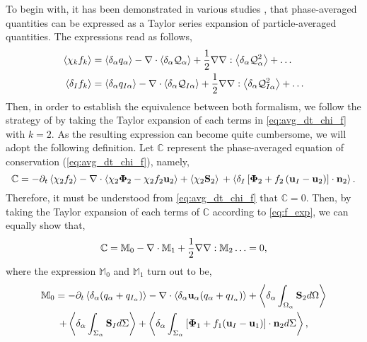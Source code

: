 To begin with, it has been demonstrated in various studies \citep{nott2011suspension,jackson1997locally,zhang1994averaged}, that phase-averaged quantities can be expressed as a Taylor series expansion of particle-averaged quantities. 
The expressions read as follows, 
\begin{align}
    \left<\chi_kf_k\right> 
    &=  \left<\delta_\alpha q_\alpha\right>
        - \mathbf{\nabla} \cdot  
        \left<\delta_\alpha \mathcal{Q}_\alpha\right>        
        + \frac{1}{2} \mathbf{\nabla}\mathbf{\nabla} : \left<\delta_\alpha \mathcal{Q}_\alpha^2\right>
        + \ldots  \\
    \left<\delta_I f_k\right> 
    &=  \left<\delta_\alpha q_{I\alpha}\right>        
        - \mathbf{\nabla} \cdot \left<\delta_\alpha \mathcal{Q}_{I\alpha}\right>
        + \frac{1}{2} \mathbf{\nabla}\mathbf{\nabla} : \left<\delta_\alpha \mathcal{Q}_{I\alpha}^{2}\right>
        + \ldots  
    \label{eq:f_exp}
\end{align}
Then, in order to establish the equivalence between both formalism, we follow the strategy of \citep{lhuillier2000bilan} by taking the Taylor expansion of each terms in \ref{eq:avg_dt_chi_f} with $k=2$. 
As the resulting expression can become quite cumbersome, we will adopt the following definition. 
Let $\mathbb{C}$ represent the phase-averaged equation of conservation (\ref{eq:avg_dt_chi_f}), namely, 
\begin{equation*}
    \mathbb{C}
    =
    - \partial_t \left<\chi_2f_2\right>
    - \mathbf{\nabla} \cdot \left<\chi_2 \mathbf{\Phi}_2 - \chi_2f_2 \textbf{u}_2\right>
    + \left<\chi_2 \textbf{S}_2\right>\\
    + \left<\delta_I\left[
        \mathbf{\Phi}_2
        + f_2
        \left(
            \textbf{u}_I
            - \textbf{u}_2
        \right)
    \right]
    \cdot \textbf{n}_2\right>. 
\end{equation*}
Therefore, it must be understood from \ref{eq:avg_dt_chi_f} that $\mathbb{C}=0$.
Then, by taking the Taylor expansion of each terms of $\mathbb{C}$ according to \ref{eq:f_exp}, we can equally show that,
\begin{equation}
    \mathbb{C} = \mathbb{M}_0 - \mathbf{\nabla} \cdot \mathbb{M}_1 + \frac{1}{2} \mathbf{\nabla}\mathbf{\nabla} : \mathbb{M}_2 \ldots = 0,
    \label{eq:scheme_equivalence}
\end{equation} 
where the expression $\mathbb{M}_0$ and $\mathbb{M}_1$ turn out to be, 
\begin{multline*}
    \mathbb{M}_0
    = 
    - \partial_t \left<\delta_\alpha (q_\alpha+q_{I_\alpha})\right>
    - \mathbf{\nabla} \cdot \left<\delta_\alpha\textbf{u}_\alpha(q_\alpha+q_{I_\alpha})\right>
    + \left<\delta_\alpha\int_{\Omega_\alpha} \textbf{S}_2 d\Omega\right>\\
    + \left<\delta_\alpha\int_{\Sigma_\alpha} \textbf{S}_I d\Sigma\right>
    + \left<\delta_\alpha\int_{\Sigma_\alpha} \left[\mathbf{\Phi}_1 + f_1 (\textbf{u}_I-\textbf{u}_1) \right] \cdot \textbf{n}_2 d\Sigma\right>,
\end{multline*}
